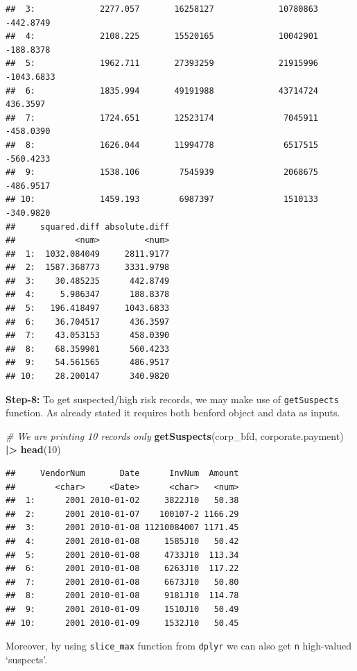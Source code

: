 \documentclass[
]{book}
\newenvironment{Shaded}{\begin{snugshade}}{\end{snugshade}}
\newcommand{\CommentTok}[1]{\textcolor[rgb]{0.56,0.35,0.01}{\textit{#1}}}
\newcommand{\DecValTok}[1]{\textcolor[rgb]{0.00,0.00,0.81}{#1}}
\newcommand{\FunctionTok}[1]{\textcolor[rgb]{0.13,0.29,0.53}{\textbf{#1}}}
\newcommand{\NormalTok}[1]{#1}
\newcommand{\SpecialCharTok}[1]{\textcolor[rgb]{0.81,0.36,0.00}{\textbf{#1}}}
\begin{document}
\begin{verbatim}
##  3:             2277.057       16258127             10780863  -442.8749
##  4:             2108.225       15520165             10042901  -188.8378
##  5:             1962.711       27393259             21915996 -1043.6833
##  6:             1835.994       49191988             43714724   436.3597
##  7:             1724.651       12523174              7045911  -458.0390
##  8:             1626.044       11994778              6517515  -560.4233
##  9:             1538.106        7545939              2068675  -486.9517
## 10:             1459.193        6987397              1510133  -340.9820
##     squared.diff absolute.diff
##            <num>         <num>
##  1:  1032.084049     2811.9177
##  2:  1587.368773     3331.9798
##  3:    30.485235      442.8749
##  4:     5.986347      188.8378
##  5:   196.418497     1043.6833
##  6:    36.704517      436.3597
##  7:    43.053153      458.0390
##  8:    68.359901      560.4233
##  9:    54.561565      486.9517
## 10:    28.200147      340.9820
\end{verbatim}

\textbf{Step-8:} To get suspected/high risk records, we may make use of \texttt{getSuspects} function. As already stated it requires both benford object and data as inputs.

\begin{Shaded}
\begin{Highlighting}[]
\CommentTok{\# We are printing 10 records only}
\FunctionTok{getSuspects}\NormalTok{(corp\_bfd, corporate.payment) }\SpecialCharTok{|\textgreater{}} 
  \FunctionTok{head}\NormalTok{(}\DecValTok{10}\NormalTok{)}
\end{Highlighting}
\end{Shaded}

\begin{verbatim}
##     VendorNum       Date      InvNum  Amount
##        <char>     <Date>      <char>   <num>
##  1:      2001 2010-01-02     3822J10   50.38
##  2:      2001 2010-01-07    100107-2 1166.29
##  3:      2001 2010-01-08 11210084007 1171.45
##  4:      2001 2010-01-08     1585J10   50.42
##  5:      2001 2010-01-08     4733J10  113.34
##  6:      2001 2010-01-08     6263J10  117.22
##  7:      2001 2010-01-08     6673J10   50.80
##  8:      2001 2010-01-08     9181J10  114.78
##  9:      2001 2010-01-09     1510J10   50.49
## 10:      2001 2010-01-09     1532J10   50.45
\end{verbatim}

Moreover, by using \texttt{slice\_max} function from \texttt{dplyr} we can also get \texttt{n} high-valued `suspects'.
\end{document}
